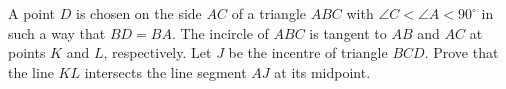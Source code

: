 A point $D$ is chosen on the side $AC$ of a triangle $ABC$ with $\angle C < \angle A < 90^{\circ}$ in such a way that $BD = BA$. The incircle of $ABC$ is tangent to $AB$ and $AC$ at points $K$ and $L$, respectively. Let $J$ be the incentre of triangle $BCD$. Prove that the line $KL$ intersects the line segment $AJ$ at its midpoint.
